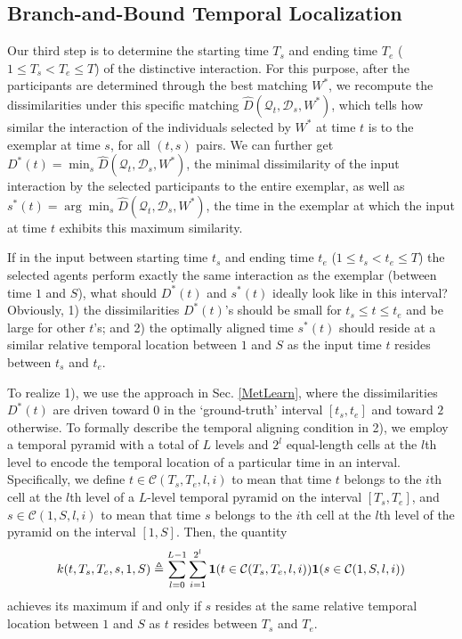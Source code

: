 \subsection{Branch-and-Bound Temporal Localization}
\label{BB}
\vspace{-5pt}
Our third step is to determine the starting time $T_s$ and ending time $T_e$ ($1\le T_s<T_e\le T$) of the distinctive interaction. For this purpose, after the participants are determined through the best matching $W^{*}$, we recompute the dissimilarities under this specific matching $\hat{D}(\mathcal{Q}_{t}, \mathcal{D}_{s}, W^{*})$, which tells how similar the interaction of the individuals selected by $W^{*}$ at time $t$ is to the exemplar at time $s$, for all $(t,s)$ pairs. We can further get  $D^{*}(t)=\min_{s}\hat{D}(\mathcal{Q}_{t}, \mathcal{D}_{s}, W^{*})$, the minimal dissimilarity of the input interaction by the selected participants to the entire exemplar, as well as $s^{*}(t)=\arg\min_{s}\hat{D}(\mathcal{Q}_{t}, \mathcal{D}_{s}, W^{*})$, the time in the exemplar at which the input at time $t$ exhibits this maximum similarity.  

If in the input between starting time $t_{s}$ and ending time $t_{e}$ ($1\leq t_{s}<t_{e}\leq T$) the selected agents perform exactly the same interaction as the exemplar (between time $1$ and $S$), what should $D^{*}(t)$ and $s^{*}(t)$ ideally look like in this interval? Obviously, 1) the dissimilarities $D^{*}(t)$'s should be small for $t_{s}\le t\le t_{e}$ and be large for other $t$'s; and 2) the optimally aligned time $s^{*}(t)$ should reside at a similar relative temporal location between $1$ and $S$ as the input time $t$ resides between $t_{s}$ and $t_{e}$.

To realize 1), we use the approach in Sec. \ref{MetLearn}, where the dissimilarities $D^{*}(t)$ are driven toward 0 in the `ground-truth' interval $[t_{s}, t_{e}]$ and toward $2$ otherwise. To formally describe the temporal aligning condition in 2), we employ a temporal pyramid with a total of $L$ levels and $2^{l}$ equal-length cells at the $l$th level to encode the temporal location of a particular time in an interval. Specifically, we define $t\in\mathcal{C}(T_{s},T_{e}, l,i)$ to mean that time $t$ belongs to the $i$th cell at the $l$th level of a $L$-level temporal pyramid on the interval $[T_{s},T_{e}]$, and $s\in\mathcal{C}(1,S, l,i)$ to mean that time $s$ belongs to the $i$th cell at the $l$th level of the pyramid on the interval $[1,S]$. Then, the quantity
\begin{equation}
\vspace{-5pt}
k(t, T_{s},T_{e}, s, 1,S)\triangleq\sum^{L-1}_{l=0}\sum^{2^{l}}_{i=1} \mathbf{1}(t\in\mathcal{C}(T_{s},T_{e}, l,i))\mathbf{1}(s\in\mathcal{C}(1,S, l,i))
\end{equation}
achieves its maximum if and only if $s$ resides at the same relative temporal location between $1$ and $S$ as $t$ resides between $T_{s}$ and $T_{e}$.


